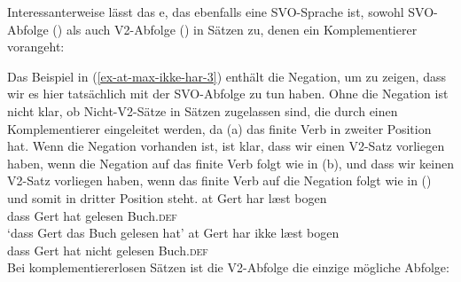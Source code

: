 \noindent
Interessanterweise lässt das e, das ebenfalls eine SVO-Sprache ist, sowohl SVO-Abfolge () als auch V2-Abfolge () in Sätzen
zu, denen ein Komplementierer vorangeht:
\z

\eal
{}
\zl
Das Beispiel in (\ref{ex-at-max-ikke-har-3}) enthält die Negation, um zu zeigen, dass wir es hier tatsächlich
mit der SVO-Abfolge zu tun haben. Ohne die Negation ist nicht klar, ob Nicht-V2-Sätze in
Sätzen zugelassen sind, die durch einen Komplementierer eingeleitet werden, da (a) das finite Verb in zweiter
Position hat. Wenn die Negation vorhanden ist, ist klar, dass wir einen V2-Satz vorliegen haben, wenn die Negation auf
das finite Verb folgt wie in (b), und dass wir keinen V2-Satz vorliegen haben, wenn das finite Verb auf die Negation folgt wie in
() und somit in dritter Position steht.
\eal
\settowidth{}
\ex
\gll at Gert har læst bogen\\
     dass Gert hat gelesen Buch.\textsc{def}\\
\glt `dass Gert das Buch gelesen hat'
\ex
\gll at   Gert har ikke læst bogen\\
     dass Gert hat nicht gelesen Buch.\textsc{def}\\
\zl
Bei komplementiererlosen Sätzen ist die V2-Abfolge die einzige mögliche Abfolge:
\eal
\settowidth{}
\zl

